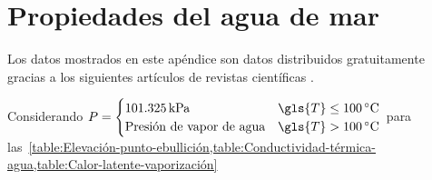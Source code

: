 %
%
%

\chapter{Propiedades del agua de mar}\label{ch:seawater-properties}

Los datos mostrados en este apéndice son datos distribuidos gratuitamente  gracias a los siguientes artículos de revistas científicas \cites{nayar_thermophysical_2016}{sharqawy_thermophysical_2010}.

	Considerando \(
		P = \begin{cases}
			\qty{101.325}{\kilo\pascal} & \gls{T} \leq \qty{100}{\degreeCelsius} \\
			\text{Presión de vapor de agua} & \gls{T} > \qty{100}{\degreeCelsius} \\
		\end{cases}
	\) para las~\cref{table:Elevación-punto-ebullición,table:Conductividad-térmica-agua,table:Calor-latente-vaporización}

